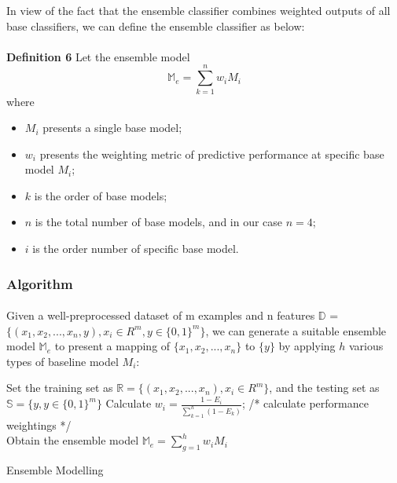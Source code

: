 \documentclass[runningheads]{llncs}
\begin{document}
In view of the fact that the ensemble classifier combines weighted outputs of all base classifiers, we can define the ensemble classifier as below: \\
\\
\textbf{Definition 6} Let the ensemble model \\
\begin{equation}\label{reio}
	\mathbb{M}_{e} = \sum_{k = 1}^{n} w_{i} M_{i} 
\end{equation}
where
\begin{itemize}
  \item $M_{i}$ presents a single base model;
  \item $w_{i}$ presents the weighting metric of predictive performance at specific base model $M_{i}$;
  \item $k$ is the order of base models;
  \item $n$ is the total number of base models, and in our case $n = 4$;
  \item $i$ is the order number of specific base model.
\end{itemize}
%
%
\subsubsection{Algorithm}
%
\paragraph{}
Given a well-preprocessed dataset of m examples and n features $\mathbb{D}$ = $\displaystyle \big\{ (x_{1}, x_{2}, ... , x_{n}, y ), x_{i} \in R^{m}, y \in {\{0, 1\}}^{m}  \big\}$, we can generate a suitable ensemble model $\mathbb{M}_{e} $ to present a mapping of $\big\{ x_{1}, x_{2}, ... , x_{n} \big\}$ to $\big\{ y \big\}$ by applying $h$ various types of baseline model $M_{i}$:\\
\IncMargin{1em}
\begin{algorithm}[H]
\BlankLine
Set the training set as $\mathbb{R} = \big\{ (x_{1}, x_{2}, ... , x_{n} ), x_{i} \in R^{m} \big\}$, and the testing set as $\mathbb{S} = \big\{  y, y \in {\{0, 1\}}^{m}  \big\}$\;
Calculate $w_{i} = \frac{1 - E_{i} }{\sum_{k = 1}^{h} (1 - E_{k}) }$; /* calculate performance weightings */\\
Obtain the ensemble model $\mathbb{M}_{e} = \sum_{g = 1}^{h} w_{i} M_{i} $\;
\caption{Ensemble Modelling}\label{ensemble}
\end{algorithm}\DecMargin{1em}
%
%
%
%
%
%
%
%
\end{document}
